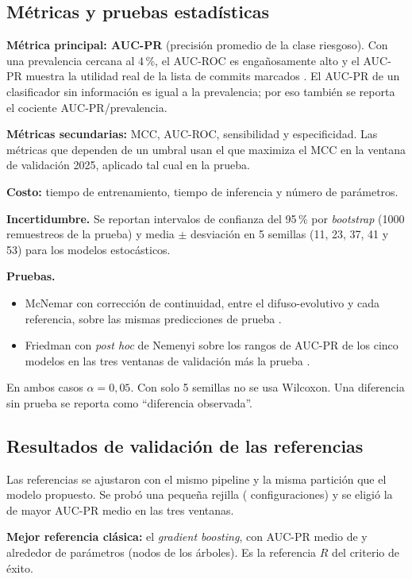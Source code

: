 \subsection{Métricas y pruebas estadísticas}

\textbf{Métrica principal: AUC-PR} (precisión promedio de la clase riesgoso). Con una prevalencia cercana al 4\,\%, el AUC-ROC es engañosamente alto y el AUC-PR muestra la utilidad real de la lista de commits marcados \cite{Saito2015}. El AUC-PR de un clasificador sin información es igual a la prevalencia; por eso también se reporta el cociente AUC-PR/prevalencia.

\textbf{Métricas secundarias:} MCC, AUC-ROC, sensibilidad y especificidad. Las métricas que dependen de un umbral usan el que maximiza el MCC en la ventana de validación 2025, aplicado tal cual en la prueba.

\textbf{Costo:} tiempo de entrenamiento, tiempo de inferencia y número de parámetros.

\textbf{Incertidumbre.} Se reportan intervalos de confianza del 95\,\% por \emph{bootstrap} (1000 remuestreos de la prueba) y media $\pm$ desviación en 5 semillas (11, 23, 37, 41 y 53) para los modelos estocásticos.

\textbf{Pruebas.}
\begin{itemize}
\item McNemar con corrección de continuidad, entre el difuso-evolutivo y cada referencia, sobre las mismas predicciones de prueba \cite{Dietterich1998}.
\item Friedman con \emph{post hoc} de Nemenyi sobre los rangos de AUC-PR de los cinco modelos en las tres ventanas de validación más la prueba \cite{Demsar2006}.
\end{itemize}
En ambos casos $\alpha=0{,}05$. Con solo 5 semillas no se usa Wilcoxon. Una diferencia sin prueba se reporta como ``diferencia observada''.

\subsection{Resultados de validación de las referencias}

Las referencias se ajustaron con el mismo pipeline y la misma partición que el modelo propuesto. Se probó una pequeña rejilla (\cifNConfigsRef{} configuraciones) y se eligió la de mayor AUC-PR medio en las tres ventanas.

\textbf{Mejor referencia clásica:} el \emph{gradient boosting}, con AUC-PR medio de \cifValGB{} y alrededor de \cifParamGB{} parámetros (nodos de los árboles). Es la referencia $R$ del criterio de éxito.

